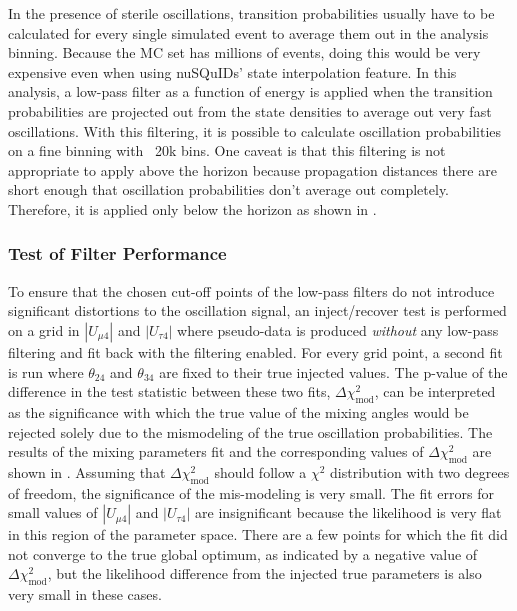 In the presence of sterile oscillations, transition probabilities usually have to be calculated for every single simulated event to average them out in the analysis binning. Because the MC set has millions of events, doing this would be very expensive even when using nuSQuIDs' state interpolation feature. In this analysis, a low-pass filter as a function of energy is applied when the transition probabilities are projected out from the state densities to average out very fast oscillations. With this filtering, it is possible to calculate oscillation probabilities on a fine binning with ~20k bins. One caveat is that this filtering is not appropriate to apply above the horizon because propagation distances there are short enough that oscillation probabilities don't average out completely. Therefore, it is applied only below the horizon as shown in .

\subsubsection{Test of Filter Performance}

To ensure that the chosen cut-off points of the low-pass filters do not introduce significant distortions to the oscillation signal, an inject/recover test is performed on a grid in $|U_{\mu 4}|$ and $|U_{\tau 4}|$ where pseudo-data is produced \emph{without} any low-pass filtering and fit back with the filtering enabled. For every grid point, a second fit is run where $\theta_{24}$ and $\theta_{34}$ are fixed to their true injected values. The p-value of the difference in the test statistic between these two fits, $\Delta \chi^2_{\mathrm{mod}}$, can be interpreted as the significance with which the true value of the mixing angles would be rejected solely due to the mismodeling of the true oscillation probabilities. The results of the mixing parameters fit and the corresponding values of $\Delta \chi^2_{\mathrm{mod}}$ are shown in . Assuming that $\Delta \chi^2_{\mathrm{mod}}$ should follow a $\chi^2$ distribution with two degrees of freedom, the significance of the mis-modeling is very small. The fit errors for small values of $|U_{\mu 4}|$ and $|U_{\tau 4}|$ are insignificant because the likelihood is very flat in this region of the parameter space. There are a few points for which the fit did not converge to the true global optimum, as indicated by a negative value of $\Delta \chi^2_\mathrm{mod}$, but the likelihood difference from the injected true parameters is also very small in these cases.

